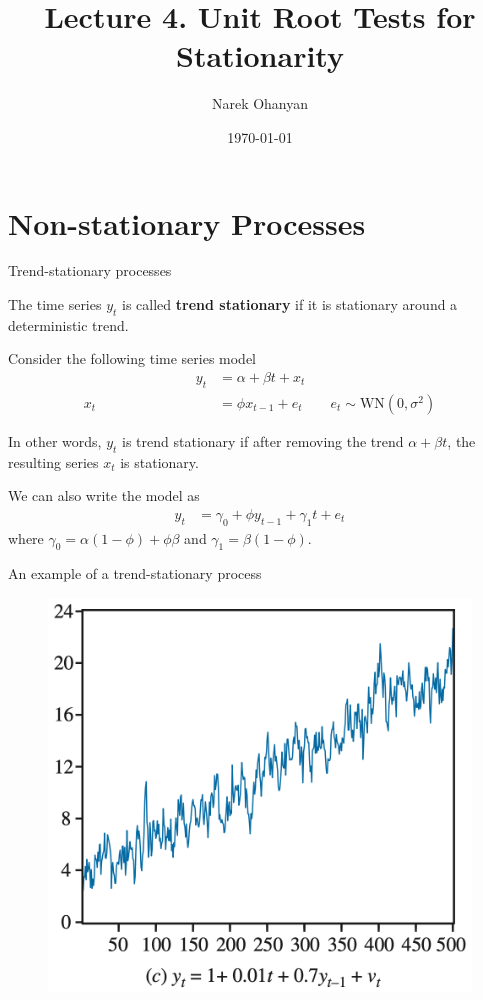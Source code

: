 \documentclass[10pt,aspectratio=169]{beamer}  %
\author[Narek Ohanyan]{Narek Ohanyan}
\title[Lecture 4. Unit Root Tests for Stationarity]{Lecture 4. Unit Root Tests for Stationarity}
\institute[AUA]{American University of Armenia}
\date{\today}
\begin{document}
\begin{frame}
    \titlepage
\end{frame}


\section{Non-stationary Processes}


\begin{frame}{Trend-stationary processes}

    \bigskip
    The time series $ y_{t} $ is called \textbf{trend stationary} if it is stationary around a deterministic trend.

    \medskip
    Consider the following time series model
    \begin{align*}
        \qquad\qquad\qquad\qquad y_{t}                          & = \alpha + \beta t + x_{t}                                                      \\
        x_{t} & = \phi x_{t-1} + e_{t} \qquad e_{t} \sim \text{WN} \left( 0, \sigma^{2} \right)
    \end{align*}

    In other words, $ y_{t} $ is trend stationary if after removing the trend $ \alpha + \beta t $, the resulting series $ x_{t} $ is stationary.

    \medskip
    We can also write the model as
    \begin{align*}
        y_{t} & = \gamma_0 + \phi y_{t-1} + \gamma_1 t + e_{t}
    \end{align*}
    where $ \gamma_0 = \alpha \left( 1 - \phi \right) + \phi \beta $ and $ \gamma_1 = \beta \left( 1 - \phi \right) $.

\end{frame}


\begin{frame}{An example of a trend-stationary process}

    \bigskip
    \begin{figure}[H]
        \centering
        \includegraphics[height=0.5\textwidth]{./fig/trend-stationary.png}
    \end{figure}

\end{frame}
\end{document}
